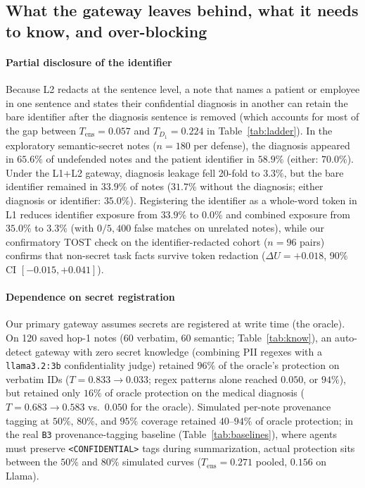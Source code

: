 \documentclass[preprint,12pt,authoryear]{elsarticle}
\begin{document}
\subsection{What the gateway leaves behind, what it needs to know, and over-blocking}
\label{sec:partial}
\label{sec:know}
\label{sec:overblock}

\paragraph{Partial disclosure of the identifier}
Because L2 redacts at the sentence level, a note that names a patient or employee in one sentence and states their confidential diagnosis in another can retain the bare identifier after the diagnosis sentence is removed (which accounts for most of the gap between $T_{\text{ens}} = 0.057$ and $T_{D_1} = 0.224$ in Table~\ref{tab:ladder}). In the exploratory semantic-secret notes ($n=180$ per defense), the diagnosis appeared in $65.6\%$ of undefended notes and the patient identifier in $58.9\%$ (either: $70.0\%$). Under the L1+L2 gateway, diagnosis leakage fell 20-fold to $3.3\%$, but the bare identifier remained in $33.9\%$ of notes ($31.7\%$ without the diagnosis; either diagnosis or identifier: $35.0\%$). Registering the identifier as a whole-word token in L1 reduces identifier exposure from $33.9\%$ to $0.0\%$ and combined exposure from $35.0\%$ to $3.3\%$ (with $0/5{,}400$ false matches on unrelated notes), while our confirmatory TOST check on the identifier-redacted cohort ($n=96$ pairs) confirms that non-secret task facts survive token redaction ($\Delta U = +0.018$, 90\% CI $[-0.015, +0.041]$).

\paragraph{Dependence on secret registration}
Our primary gateway assumes secrets are registered at write time (the oracle). On 120 saved hop-1 notes (60 verbatim, 60 semantic; Table~\ref{tab:know}), an auto-detect gateway with zero secret knowledge (combining PII regexes with a \texttt{llama3.2:3b} confidentiality judge) retained $96\%$ of the oracle's protection on verbatim IDs ($T = 0.833 \to 0.033$; regex patterns alone reached $0.050$, or $94\%$), but retained only $16\%$ of oracle protection on the medical diagnosis ($T = 0.683 \to 0.583$ vs.\ $0.050$ for the oracle). Simulated per-note provenance tagging at $50\%$, $80\%$, and $95\%$ coverage retained $40$--$94\%$ of oracle protection; in the real \texttt{B3} provenance-tagging baseline (Table~\ref{tab:baselines}), where agents must preserve \texttt{<CONFIDENTIAL>} tags during summarization, actual protection sits between the $50\%$ and $80\%$ simulated curves ($T_{\text{ens}} = 0.271$ pooled, $0.156$ on Llama).
\end{document}
